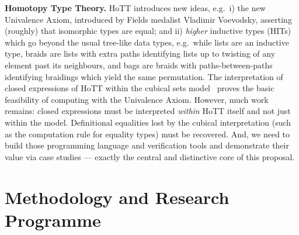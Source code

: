\documentclass[a4paper,11pt]{article}
\newcommand{\eg}{{e.g.}\ }
\begin{document}


{\bf Homotopy Type Theory.} HoTT introduces new ideas, \eg i) the new Univalence
Axiom, introduced by Fields medalist Vladimir Voevodsky, asserting
(roughly) that isomorphic types are equal; and ii) \emph{higher} inductive types (HITs)
which go beyond the usual tree-like data types, \eg while lists are an
inductive type, braids are lists with extra paths identifying lists up
to twisting of any element past its neighbours, and bags are braids
with paths-between-paths identifying braidings which yield the same
permutation.  The interpretation of closed expressions of HoTT within
the cubical sets model~\cite{BezemM:cubsmt, nominal} proves the basic
feasibility of computing with the Univalence Axiom.  However, much
work remains: closed expressions must be interpreted \emph{within}
HoTT itself and not just within the model. Definitional equalities
lost by the cubical interpretation (such as the computation rule for
equality types) must be recovered. And, we need to build
those programming language and verification tools and demonstrate their value via case studies --- exactly
the central and distinctive core of this proposal.








\vspace*{-0.2in}

\section{Methodology and Research Programme}
\vspace*{-0.1in}
\end{document}
